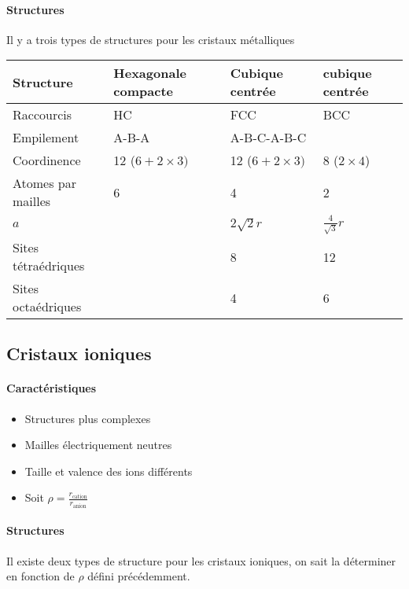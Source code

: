 \documentclass[11pt,a4paper,french]{article}
\begin{document}
\paragraph{Structures}
Il y a trois types de structures pour les cristaux métalliques
\begin{center}
	\begin{tabular}{|p{2cm}|l|l|l|}
		\hline
		Structure & Hexagonale compacte & Cubique centrée & cubique centrée\\
		\hline
		Raccourcis & HC & FCC & BCC\\
		\hline
		Empilement & A-B-A & A-B-C-A-B-C\\
		\hline
		Coordinence & 12 ($6 + 2\times3)$ & 12 ($6 + 2\times3)$ & 8 ($2 \times 4$)\\
		\hline
		Atomes par mailles & 6 & 4 & 2\\
		\hline
		$a$ & & $2\sqrt{2}r$ & $\frac{4}{\sqrt{3}}r$\\
		\hline
		Sites tétraédriques & & 8 & 12\\
		\hline
		Sites octaédriques & & 4 & 6\\
		\hline
	\end{tabular}
\end{center}

\subsection{Cristaux ioniques}

\paragraph{Caractéristiques}
\begin{itemize}
	\item Structures plus complexes
	\item Mailles électriquement neutres
	\item Taille et valence des ions différents
	\item Soit $\rho = \frac{r_\mathrm{cation}}{r_\mathrm{anion}}$
\end{itemize}

\paragraph{Structures}
Il existe deux types de structure pour les cristaux ioniques, on sait la déterminer en fonction de $\rho$ défini précédemment.
\end{document}
